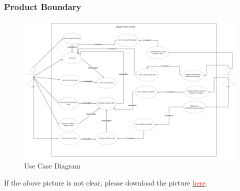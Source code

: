 \documentclass{article}
\begin{document}
\subsubsection{Product Boundary}
\begin{figure}[H]
    \centering
    \includegraphics[scale=0.3]{SRS_Pictures/Use_Case.png}
    \caption{Use Case Diagram}
\end{figure}
\noindent If the above picture is not clear, please download the picture \href{https://github.com/wuj187/DigitalTwinCAS/blob/main/docs/SRS/SRS_Pictures/Use_Case.png}{\textcolor{red}{here}}.
\end{document}
